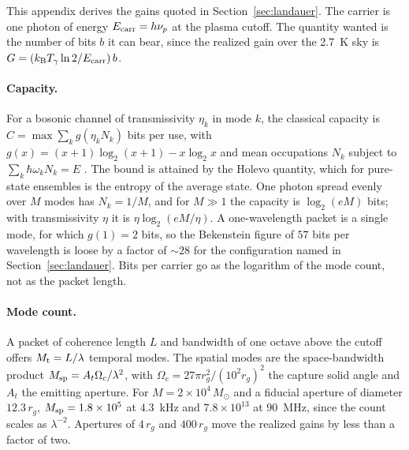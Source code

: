 \documentclass[11pt]{article}
\newcommand{\msun}{\ensuremath{M_\odot}}
\newcommand{\kb}{\ensuremath{k_{\mathrm{B}}}}
\begin{document}
This appendix derives the gains quoted in Section~\ref{sec:landauer}. The carrier is one photon of energy $E_{\rm carr} = h\nu_p$ at the plasma cutoff. The quantity wanted is the number of bits $b$ it can bear, since the realized gain over the 2.7~K sky is $G = (\kb T_\gamma \ln 2 / E_{\rm carr})\,b$.

\paragraph{Capacity.} For a bosonic channel of transmissivity $\eta_k$ in mode $k$, the classical capacity is $C = \max \sum_k g(\eta_k N_k)$ bits per use, with $g(x) = (x+1)\log_2(x+1) - x\log_2 x$ and mean occupations $N_k$ subject to $\sum_k \hbar\omega_k N_k = E$ \citep[Eqs.~4, 5, 14]{Giovannetti2004}. The bound is attained by the Holevo quantity, which for pure-state ensembles is the entropy of the average state. One photon spread evenly over $M$ modes has $N_k = 1/M$, and for $M \gg 1$ the capacity is $\log_2(eM)$ bits; with transmissivity $\eta$ it is $\eta\log_2(eM/\eta)$. A one-wavelength packet is a single mode, for which $g(1) = 2$ bits, so the Bekenstein figure of $57$ bits per wavelength is loose by a factor of $\sim 28$ for the configuration named in Section~\ref{sec:landauer}. Bits per carrier go as the logarithm of the mode count, not as the packet length.

\paragraph{Mode count.} A packet of coherence length $L$ and bandwidth of one octave above the cutoff offers $M_{\rm t} = L/\lambda$ temporal modes. The spatial modes are the space-bandwidth product $M_{\rm sp} = A_t\Omega_c/\lambda^{2}$, with $\Omega_c = 27\pi r_g^{2}/(10^{2}r_g)^{2}$ the capture solid angle and $A_t$ the emitting aperture. For $M = 2\times10^{4}\,\msun$ and a fiducial aperture of diameter $12.3\,r_g$, $M_{\rm sp} = 1.8\times10^{5}$ at $4.3$~kHz and $7.8\times10^{13}$ at $90$~MHz, since the count scales as $\lambda^{-2}$. Apertures of $4\,r_g$ and $400\,r_g$ move the realized gains by less than a factor of two.
\end{document}
